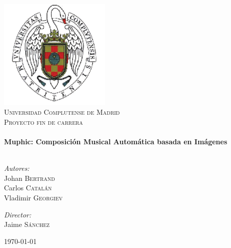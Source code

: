 
\begin{titlepage}
\thispagestyle{empty}
  \begin{adjustwidth}{0cm}{-1cm}


\begin{center}


\includegraphics[width=0.4\textwidth]{./graphics/escudo-ucm.png}\\[1cm]    

\textsc{\LARGE Universidad Complutense de Madrid}\\[1.5cm]

\textsc{\Large Proyecto fin de carrera}\\[0.5cm]


\HRule \\[0.4cm]
{ \huge \bfseries Muphic: Composición Musical Automática basada en Imágenes}\\[0.4cm]

\HRule \\[1.5cm]

\begin{minipage}{0.4\textwidth}
\begin{flushleft} \large
\emph{Autores:}\\
Johan \textsc{Bertrand}\\
Carlos \textsc{Catalán}\\
Vladimir \textsc{Georgiev}
\end{flushleft}
\end{minipage}
\begin{minipage}{0.4\textwidth}
\begin{flushright} \large
\emph{Director:} \\
Jaime \textsc{Sánchez}
\end{flushright}
\end{minipage}

\vfill

{\large \today}

\end{center}

  \end{adjustwidth}
\end{titlepage}
